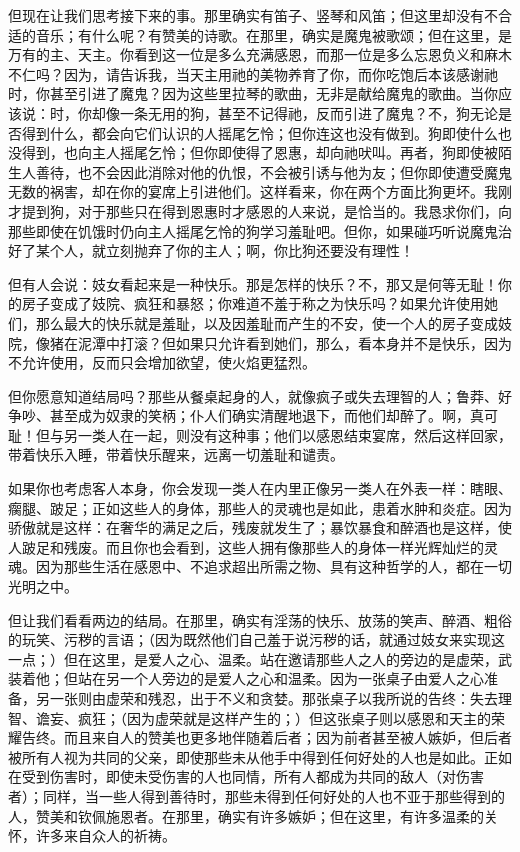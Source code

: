 但现在让我们思考接下来的事。那里确实有笛子、竖琴和风笛；但这里却没有不合适的音乐；有什么呢？有赞美的诗歌。在那里，确实是魔鬼被歌颂；但在这里，是万有的主、天主。你看到这一位是多么充满感恩，而那一位是多么忘恩负义和麻木不仁吗？因为，请告诉我，当天主用祂的美物养育了你，而你吃饱后本该感谢祂时，你甚至引进了魔鬼？因为这些里拉琴的歌曲，无非是献给魔鬼的歌曲。当你应该说：时，你却像一条无用的狗，甚至不记得祂，反而引进了魔鬼？不，狗无论是否得到什么，都会向它们认识的人摇尾乞怜；但你连这也没有做到。狗即使什么也没得到，也向主人摇尾乞怜；但你即使得了恩惠，却向祂吠叫。再者，狗即使被陌生人善待，也不会因此消除对他的仇恨，不会被引诱与他为友；但你即使遭受魔鬼无数的祸害，却在你的宴席上引进他们。这样看来，你在两个方面比狗更坏。我刚才提到狗，对于那些只在得到恩惠时才感恩的人来说，是恰当的。我恳求你们，向那些即使在饥饿时仍向主人摇尾乞怜的狗学习羞耻吧。但你，如果碰巧听说魔鬼治好了某个人，就立刻抛弃了你的主人；啊，你比狗还要没有理性！\par

但有人会说：妓女看起来是一种快乐。那是怎样的快乐？不，那又是何等无耻！你的房子变成了妓院、疯狂和暴怒；你难道不羞于称之为快乐吗？如果允许使用她们，那么最大的快乐就是羞耻，以及因羞耻而产生的不安，使一个人的房子变成妓院，像猪在泥潭中打滚？但如果只允许看到她们，那么，看本身并不是快乐，因为不允许使用，反而只会增加欲望，使火焰更猛烈。\par

但你愿意知道结局吗？那些从餐桌起身的人，就像疯子或失去理智的人；鲁莽、好争吵、甚至成为奴隶的笑柄；仆人们确实清醒地退下，而他们却醉了。啊，真可耻！但与另一类人在一起，则没有这种事；他们以感恩结束宴席，然后这样回家，带着快乐入睡，带着快乐醒来，远离一切羞耻和谴责。\par

如果你也考虑客人本身，你会发现一类人在内里正像另一类人在外表一样：瞎眼、瘸腿、跛足；正如这些人的身体，那些人的灵魂也是如此，患着水肿和炎症。因为骄傲就是这样：在奢华的满足之后，残废就发生了；暴饮暴食和醉酒也是这样，使人跛足和残废。而且你也会看到，这些人拥有像那些人的身体一样光辉灿烂的灵魂。因为那些生活在感恩中、不追求超出所需之物、具有这种哲学的人，都在一切光明之中。\par

但让我们看看两边的结局。在那里，确实有淫荡的快乐、放荡的笑声、醉酒、粗俗的玩笑、污秽的言语；（因为既然他们自己羞于说污秽的话，就通过妓女来实现这一点；）但在这里，是爱人之心、温柔。站在邀请那些人之人的旁边的是虚荣，武装着他；但站在另一个人旁边的是爱人之心和温柔。因为一张桌子由爱人之心准备，另一张则由虚荣和残忍，出于不义和贪婪。那张桌子以我所说的告终：失去理智、谵妄、疯狂；（因为虚荣就是这样产生的；）但这张桌子则以感恩和天主的荣耀告终。而且来自人的赞美也更多地伴随着后者；因为前者甚至被人嫉妒，但后者被所有人视为共同的父亲，即使那些未从他手中得到任何好处的人也是如此。正如在受到伤害时，即使未受伤害的人也同情，所有人都成为共同的敌人（对伤害者）；同样，当一些人得到善待时，那些未得到任何好处的人也不亚于那些得到的人，赞美和钦佩施恩者。在那里，确实有许多嫉妒；但在这里，有许多温柔的关怀，许多来自众人的祈祷。\par

